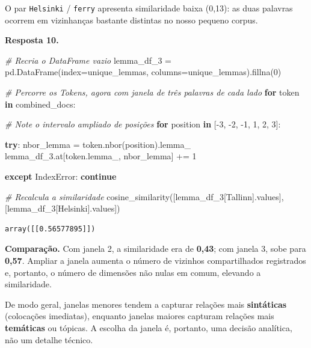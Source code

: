 \documentclass[
  brazilian,
]{article}
\newenvironment{Shaded}{}{}
\newcommand{\CommentTok}[1]{\textcolor[rgb]{0.38,0.63,0.69}{\textit{#1}}}
\newcommand{\ControlFlowTok}[1]{\textcolor[rgb]{0.00,0.44,0.13}{\textbf{#1}}}
\newcommand{\DecValTok}[1]{\textcolor[rgb]{0.25,0.63,0.44}{#1}}
\newcommand{\KeywordTok}[1]{\textcolor[rgb]{0.00,0.44,0.13}{\textbf{#1}}}
\newcommand{\NormalTok}[1]{#1}
\newcommand{\OperatorTok}[1]{\textcolor[rgb]{0.40,0.40,0.40}{#1}}
\newcommand{\PreprocessorTok}[1]{\textcolor[rgb]{0.74,0.48,0.00}{#1}}
\newcommand{\StringTok}[1]{\textcolor[rgb]{0.25,0.44,0.63}{#1}}
\begin{document}
O par \texttt{Helsinki} / \texttt{ferry} apresenta similaridade baixa
(0,13): as duas palavras ocorrem em vizinhanças bastante distintas no
nosso pequeno corpus.

\textbf{Resposta 10.}

\begin{Shaded}
\begin{Highlighting}[]
\CommentTok{\# Recria o DataFrame vazio}
\NormalTok{lemma\_df\_3 }\OperatorTok{=}\NormalTok{ pd.DataFrame(index}\OperatorTok{=}\NormalTok{unique\_lemmas, columns}\OperatorTok{=}\NormalTok{unique\_lemmas).fillna(}\DecValTok{0}\NormalTok{)}

\CommentTok{\# Percorre os Tokens, agora com janela de três palavras de cada lado}
\ControlFlowTok{for}\NormalTok{ token }\KeywordTok{in}\NormalTok{ combined\_docs:}

    \CommentTok{\# Note o intervalo ampliado de posições}
    \ControlFlowTok{for}\NormalTok{ position }\KeywordTok{in}\NormalTok{ [}\OperatorTok{{-}}\DecValTok{3}\NormalTok{, }\OperatorTok{{-}}\DecValTok{2}\NormalTok{, }\OperatorTok{{-}}\DecValTok{1}\NormalTok{, }\DecValTok{1}\NormalTok{, }\DecValTok{2}\NormalTok{, }\DecValTok{3}\NormalTok{]:}

        \ControlFlowTok{try}\NormalTok{:}
\NormalTok{            nbor\_lemma }\OperatorTok{=}\NormalTok{ token.nbor(position).lemma\_}
\NormalTok{            lemma\_df\_3.at[token.lemma\_, nbor\_lemma] }\OperatorTok{+=} \DecValTok{1}

        \ControlFlowTok{except} \PreprocessorTok{IndexError}\NormalTok{:}
            \ControlFlowTok{continue}

\CommentTok{\# Recalcula a similaridade}
\NormalTok{cosine\_similarity([lemma\_df\_3[}\StringTok{\textquotesingle{}Tallinn\textquotesingle{}}\NormalTok{].values], [lemma\_df\_3[}\StringTok{\textquotesingle{}Helsinki\textquotesingle{}}\NormalTok{].values])}
\end{Highlighting}
\end{Shaded}

\begin{verbatim}
array([[0.56577895]])
\end{verbatim}

\textbf{Comparação.} Com janela 2, a similaridade era de \textbf{0,43};
com janela 3, sobe para \textbf{0,57}. Ampliar a janela aumenta o número
de vizinhos compartilhados registrados e, portanto, o número de
dimensões não nulas em comum, elevando a similaridade.

De modo geral, janelas menores tendem a capturar relações mais
\textbf{sintáticas} (colocações imediatas), enquanto janelas maiores
capturam relações mais \textbf{temáticas} ou tópicas. A escolha da
janela é, portanto, uma decisão analítica, não um detalhe técnico.
\end{document}
